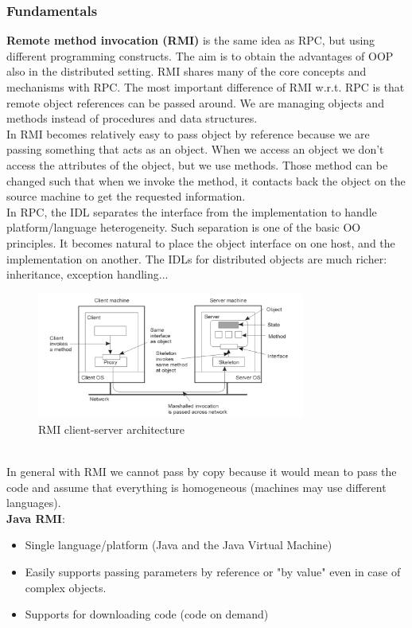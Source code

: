 \documentclass[10pt,a4paper]{article}
\begin{document}
\subsubsection{Fundamentals}
\textbf{Remote method invocation (RMI)} is the same idea as RPC, but using different programming constructs. The aim is to obtain the advantages of OOP also in the distributed setting. RMI shares many of the core concepts and mechanisms with RPC. The most important difference of RMI w.r.t. RPC is that remote object references can be passed around. We are managing objects and methods instead of procedures and data structures. \\ In RMI becomes relatively easy to pass object by reference because we are passing something that acts as an object. When we access an object we don't access the attributes of the object, but we use methods. Those method can be changed such that when we invoke the method, it contacts back the object on the source machine to get the requested information. \\
In RPC, the IDL separates the interface from the implementation to handle platform/language heterogeneity. Such separation is one of the basic OO principles. It becomes natural to place the object interface on one host, and the implementation on another. The IDLs for distributed objects are much richer: inheritance, exception handling...
 \begin{figure}[h!]
 \hfill \includegraphics[width=250pt]{images/rmi.png}\hspace*{\fill}
 \caption{RMI client-server architecture}
  \label{fig:rmi}
\end{figure} \\
In general with RMI we cannot pass by copy because it would mean to pass the code and assume that everything is homogeneous (machines may use different languages).\\ \textbf{Java RMI}:
\begin{itemize}
	\item Single language/platform (Java and the Java Virtual Machine)
	\item Easily supports passing parameters by reference or "by value" even in case of complex objects.
	\item Supports for downloading code (code on demand)
\end{itemize}
\end{document}

